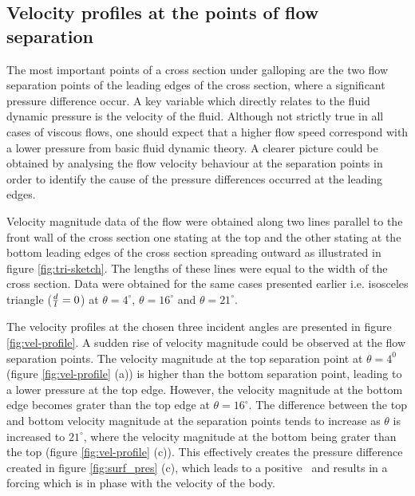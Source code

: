 \subsection{Velocity profiles at the points of flow separation}

The most important points of a cross section under galloping are the two flow separation points of the leading edges of the cross section, where a significant pressure difference occur. A key variable which directly relates to the fluid dynamic pressure is the velocity of the fluid. Although not strictly true in all cases of viscous flows, one should expect that a higher flow speed correspond with a lower pressure from basic fluid dynamic theory. A clearer picture could be obtained by analysing the flow velocity behaviour at the separation points in order to identify the cause of the pressure differences occurred at the leading edges.


   
Velocity magnitude data of the flow were obtained along two lines parallel to the front wall of the cross section one stating at the top and the other stating at the bottom leading edges of the cross section spreading outward as illustrated in figure \ref{fig:tri-sketch}. The lengths of these lines were equal to the width of the cross section. Data were obtained for the same cases presented earlier i.e. isosceles triangle ($\frac{d}{l}=0$) at $\theta=4^{\circ}$, $\theta=16^{\circ}$ and $\theta=21^{\circ}$.
       


The velocity profiles at the chosen three incident angles are presented in figure \ref{fig:vel-profile}. A sudden rise of velocity magnitude could be observed at the flow separation points. The velocity magnitude at the top separation point  at $\theta= 4^{0}$ (figure \ref{fig:vel-profile} (a)) is higher than the bottom separation point, leading to a lower pressure at the top edge. However, the velocity magnitude at the bottom edge becomes grater than the top edge at $\theta=16^{\circ}$. The difference between the top and bottom velocity magnitude at the separation points tends to increase as $\theta$ is increased to $21^{\circ}$, where the velocity magnitude at the bottom being grater than the top (figure \ref{fig:vel-profile} (c)). This effectively creates the pressure difference created in figure \ref{fig:surf_pres} (c), which leads to a positive \cy\ and results in a forcing which is in phase with the velocity of the body. 


